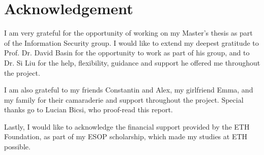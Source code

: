 \newpage


\section*{Acknowledgement}
I am very grateful for the opportunity of working on my Master's thesis as part of the Information Security group. I would like to extend my deepest gratitude to Prof. Dr. David Basin for the opportunity to work as part of his group, and to Dr. Si Liu for the help, flexibility, guidance and support he offered me throughout the project.  

I am also grateful to my friends Constantin and Alex, my girlfriend Emma, and my family for their camaraderie and support throughout the project. Special thanks go to Lucian Bicsi, who proof-read this report.

Lastly, I would like to acknowledge the financial support provided by the ETH Foundation, as part of my ESOP scholarship, which made my studies at ETH possible.

